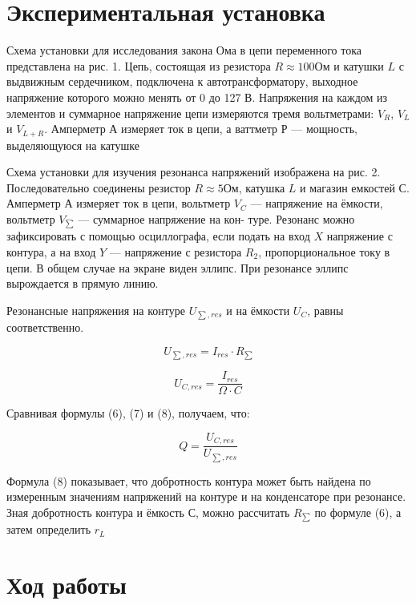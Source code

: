 \documentclass[a4paper, 14pt]{extarticle}%
\begin{document}
\section{Экспериментальная установка}
Схема установки для исследования
закона Ома в цепи переменного тока представлена на рис. 1. Цепь, состоящая из резистора $R \approx 100 Ом$ и катушки $L$ с выдвижным сердечником, подключена к автотрансформатору, выходное напряжение которого можно менять от 0 до 127 В. Напряжения на каждом из элементов
и суммарное напряжение цепи измеряются тремя вольтметрами: $V_R$, $V_L$ и $V_{L+R}$. Амперметр $А$ измеряет ток в цепи, а ваттметр $Р$ — мощность,
выделяющуюся на катушке

Схема установки для изучения резонанса напряжений изображена
на рис. 2. Последовательно соединены резистор $R \approx 5 Ом$, катушка $L$ и
магазин емкостей $С$. Амперметр $А$ измеряет ток в цепи, вольтметр $V_C$ —
напряжение на ёмкости, вольтметр $V_{\sum}$ — суммарное напряжение на кон-
туре. Резонанс можно зафиксировать с помощью осциллографа, если
подать на вход $X$ напряжение с контура, а на вход $Y$ — напряжение с
резистора $R_2$, пропорциональное току в цепи. В общем случае на экране
виден эллипс. При резонансе эллипс вырождается в прямую линию.

Резонансные напряжения на контуре $U_{\sum, res}$  и на ёмкости $U_C$,
равны соответственно.

\begin{equation}\label{}
U_{\sum, res} = I_{res}\cdot R_{\sum}
\end{equation}

\begin{equation}\label{}
U_{C,res} = \frac{I_{res}}{\Omega \cdot C}
\end{equation}

Сравнивая формулы (6), (7) и (8), получаем, что:


\begin{equation}\label{}
Q = \frac{U_{C, res}}{U_{\sum, res}}
\end{equation}

Формула (8) показывает, что добротность контура может быть найдена по измеренным значениям напряжений на контуре и на конденсаторе при резонансе. Зная добротность контура и ёмкость С, можно рассчитать $R_{\sum}$ по формуле (6), а затем определить $r_L$


\section{Ход работы}
\end{document}
